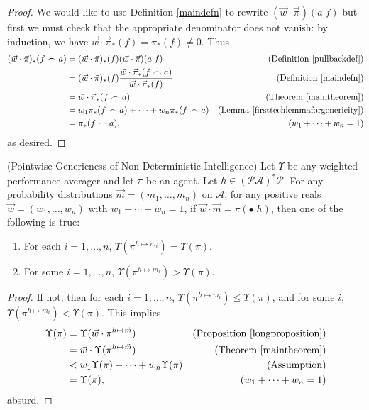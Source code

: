 \documentclass[runningheads]{llncs}
\begin{document}
\begin{proof}
    We would like to use Definition \ref{maindefn} to rewrite
    $(\vec w\cdot\vec\pi)(a|f)$ but first we must
    check that the appropriate denominator does not vanish:
    by induction, we have
    $\vec w\cdot\vec\pi_*(f)=\pi_*(f)\not=0$.
    Thus
    \begin{align*}
        (\vec w\cdot\vec\pi)_*(f\frown a)
            &= (\vec w\cdot\vec\pi)_*(f)
                (\vec w\cdot\vec\pi)(a|f)
                    &\mbox{(Definition \ref{pullbackdef})}\\
            &= (\vec w\cdot\vec\pi)_*(f)\frac{\vec w\cdot\vec\pi_*(f\frown a)}
                {\vec w\cdot\vec\pi_*(f)}
                    &\mbox{(Definition \ref{maindefn})}\\
            &= \vec w\cdot\vec\pi_*(f\frown a)
                    &\mbox{(Theorem \ref{maintheorem})}\\
            &= w_1\pi_*(f\frown a)+\cdots+w_n\pi_*(f\frown a)
                    &\mbox{(Lemma \ref{firsttechlemmaforgenericity})}\\
            &= \pi_*(f\frown a),
                    &\mbox{($w_1+\cdots+w_n=1$)}
    \end{align*}
    as desired.
\end{proof}

\begin{theorem}
\label{pointwisegenericnessthm}
    (Pointwise Genericness of Non-Deterministic Intelligence)
    Let $\Upsilon$ be any weighted performance averager and let
    $\pi$ be an agent.
    Let $h\in (\mathcal P\mathcal A)^*\mathcal P$.
    For any probability distributions $\vec m=(m_1,\ldots,m_n)$ on $\mathcal A$,
    for any positive reals $\vec w=(w_1,\ldots,w_n)$ with $w_1+\cdots+w_n=1$,
    if $\vec w\cdot\vec m=\pi(\bullet|h)$,
    then one of the following is true:
    \begin{enumerate}
        \item For each $i=1,\ldots,n$, $\Upsilon(\pi^{h\mapsto m_i})=\Upsilon(\pi)$.
        \item For some $i=1,\ldots,n$, $\Upsilon(\pi^{h\mapsto m_i})>\Upsilon(\pi)$.
    \end{enumerate}
\end{theorem}

\begin{proof}
    If not, then for each $i=1,\ldots,n$, $\Upsilon(\pi^{h\mapsto m_i})\leq\Upsilon(\pi)$,
    and for some $i$, $\Upsilon(\pi^{h\mapsto m_i})<\Upsilon(\pi)$.
    This implies
    \begin{align*}
        \Upsilon(\pi)
            &= \Upsilon(\vec w\cdot\pi^{h\mapsto\vec m})
                &\mbox{(Proposition \ref{longproposition})}\\
            &= \vec w\cdot\Upsilon(\pi^{h\mapsto\vec m})
                &\mbox{(Theorem \ref{maintheorem})}\\
            &< w_1\Upsilon(\pi)+\cdots+w_n\Upsilon(\pi)
                &\mbox{(Assumption)}\\
            &= \Upsilon(\pi),
                &\mbox{($w_1+\cdots+w_n=1$)}
    \end{align*}
    absurd.
\end{proof}
\end{document}
